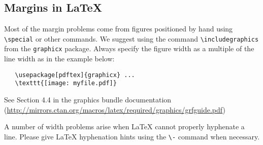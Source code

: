 \documentclass{article}
\begin{document}
\subsection{Margins in \LaTeX{}}

Most of the margin problems come from figures positioned by hand using
\verb+\special+ or other commands. We suggest using the command
\verb+\includegraphics+ from the \verb+graphicx+ package. Always specify the
figure width as a multiple of the line width as in the example below:
\begin{verbatim}
   \usepackage[pdftex]{graphicx} ...
   \texttt{[image: myfile.pdf]}
\end{verbatim}
See Section 4.4 in the graphics bundle documentation
(\url{http://mirrors.ctan.org/macros/latex/required/graphics/grfguide.pdf})

A number of width problems arise when \LaTeX{} cannot properly hyphenate a
line. Please give LaTeX hyphenation hints using the \verb+\-+ command when
necessary.





\end{document}

